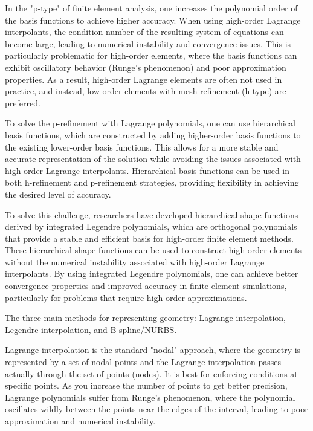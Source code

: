 \documentclass[12pt,report,justified]{SANDreport}
\begin{document}
In the "p-type" of finite element analysis, one increases the polynomial order of the basis functions to achieve higher accuracy.   When using high-order Lagrange interpolants, the condition number of the resulting system of equations can become large, leading to numerical instability and convergence issues.  This is particularly problematic for high-order elements, where the basis functions can exhibit oscillatory behavior (Runge's phenomenon) and poor approximation properties.  As a result, high-order Lagrange elements are often not used in practice, and instead, low-order elements with mesh refinement (h-type) are preferred.

To solve the p-refinement with Lagrange polynomials, one can use hierarchical basis functions, which are constructed by adding higher-order basis functions to the existing lower-order basis functions.  This allows for a more stable and accurate representation of the solution while avoiding the issues associated with high-order Lagrange interpolants.  Hierarchical basis functions can be used in both h-refinement and p-refinement strategies, providing flexibility in achieving the desired level of accuracy.

To solve this challenge, researchers have developed hierarchical shape functions derived by integrated Legendre polynomials, which are orthogonal polynomials that provide a stable and efficient basis for high-order finite element methods.  These hierarchical shape functions can be used to construct high-order elements without the numerical instability associated with high-order Lagrange interpolants.  By using integrated Legendre polynomials, one can achieve better convergence properties and improved accuracy in finite element simulations, particularly for problems that require high-order approximations.

The three main methods for representing geometry:  Lagrange interpolation, Legendre interpolation, and B-spline/NURBS.

Lagrange interpolation is the standard "nodal" approach, where the geometry is represented by a set of nodal points and the Lagrange interpolation passes actually through the set of points (nodes).  It is best for enforcing conditions at specific points.  As you increase the number of points to get better precision, Lagrange polynomials suffer from Runge's phenomenon, where the polynomial oscillates wildly between the points near the edges of the interval, leading to poor approximation and numerical instability.
\end{document}
